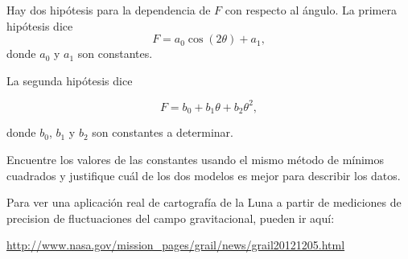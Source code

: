 \documentclass{article}
\begin{document}
\begin{enumerate}
Hay dos hip\'otesis para la dependencia de $F$ con respecto al
\'angulo. La primera hip\'otesis dice
\begin{equation}
F = a_{0}\cos(2\theta) + a_{1},
\end{equation}
donde $a_{0}$ y $a_{1}$ son constantes.

La segunda hip\'otesis dice

\begin{equation}
F = b_{0} + b_{1}\theta + b_{2}\theta^2, 
\end{equation}

donde $b_{0}$, $b_{1}$ y $b_{2}$ son constantes a determinar.

Encuentre los valores de las constantes usando el mismo m\'etodo de
m\'inimos cuadrados y justifique cu\'al de los dos modelos es mejor
para describir los datos. 


\end{enumerate}


\vspace{1cm}

Para ver una aplicaci\'on real de cartograf\'ia de la Luna a
partir de mediciones de precision de fluctuaciones del campo
gravitacional, pueden ir aqu\'i:

\url{http://www.nasa.gov/mission_pages/grail/news/grail20121205.html}
\end{document}
